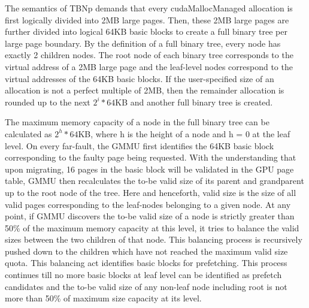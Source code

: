 The semantics of TBNp demands that every cudaMallocManaged allocation is first logically divided into 2MB large pages. Then, these 2MB large pages are further divided into logical 64KB basic blocks to create a full binary tree  per large page boundary. By the definition of a full binary tree, every node has exactly 2 children nodes. The root node of each binary tree corresponds to the virtual address of a 2MB large page and the leaf-level nodes correspond to the virtual addresses of the 64KB basic blocks. If the user-specified size of an allocation is not a perfect multiple of 2MB, then the remainder allocation is rounded up to the next $2^i * 64$KB and another full binary tree is created.

The maximum memory capacity of a node in the full binary tree can be calculated as $2^h * 64$KB, where h is the height of a node and h = 0 at the leaf level. On every far-fault, the GMMU first identifies the 64KB basic block corresponding to the faulty page being requested. With the understanding that upon migrating, 16 pages in the basic block will be validated in the GPU page table, GMMU then recalculates the to-be valid size of its parent and grandparent up to the root node of the tree. Here and henceforth, valid size is the size of all valid pages corresponding to the leaf-nodes belonging to a given node. At any point, if GMMU discovers the to-be valid size of a node is strictly greater than 50\% of the maximum memory capacity at this level, it tries to balance the valid sizes between the two children of that node. This balancing process is recursively pushed down to the children which have not reached the maximum valid size quota. This balancing act identifies basic blocks for prefetching. This process continues till no more basic blocks at leaf level can be identified as prefetch candidates and the to-be valid size of any non-leaf node including root is not more than 50\% of maximum size capacity at its level. 

